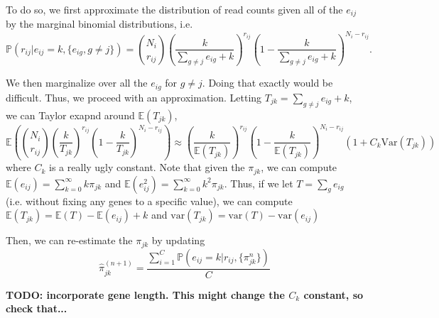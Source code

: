 \documentclass[11pt, oneside]{article}   	%
\begin{document}
To do so, we first approximate the distribution of read counts given all of the $e_{ij}$ by the marginal binomial distributions, i.e.
\[
\mathbb{P}(r_{ij} | e_{ij} = k, \{e_{ig}, g \neq j\}) = \binom{N_i}{r_{ij}} \left(\frac{k}{\sum_{g \neq j} e_{ig} + k}\right)^{r_{ij}}\left(1-\frac{k}{\sum_{g \neq j} e_{ig} + k}\right)^{N_i - r_{ij}}.
\]

We then marginalize over all the $e_{ig}$ for $g \neq j$. Doing that exactly would be difficult. Thus, we proceed with an approximation. Letting $T_{jk} = \sum_{g \neq j }e_{ig} + k$, we can Taylor exapnd around $\mathbb{E}(T_{jk})$, 
\[
\mathbb{E}\left(\binom{N_i}{r_{ij}} \left(\frac{k}{T_{jk}}\right)^{r_{ij}}\left(1-\frac{k}{T_{jk}}\right)^{N_i - r_{ij}}\right) \approx \left(\frac{k}{\mathbb{E}(T_{jk})} \right)^{r_{ij}}\left(1 - \frac{k}{\mathbb{E}(T_{jk})} \right)^{N_i - r_{ij}}\left(1 + C_k \text{Var}(T_{jk})\right)
\]
where $C_k$ is a really ugly constant. Note that given the $\pi_{jk}$, we can compute $\mathbb{E}(e_{ij}) = \sum_{k=0}^\infty k \pi_{jk}$ and $\mathbb{E}(e_{ij}^2) = \sum_{k=0}^\infty k^2 \pi_{jk}$. Thus, if we let $T = \sum_g e_{ig}$ (i.e. without fixing any genes to a specific value), we can compute $\mathbb{E}(T_{jk}) = \mathbb{E}(T) - \mathbb{E}(e_{ij})+k$ and $\text{var}(T_{jk}) = \text{var}(T) - \text{var}(e_{ij})$

Then, we can re-estimate the $\pi_{jk}$ by updating
\[
\hat{\pi}_{jk}^{(n+1)} = \frac{\sum_{i=1}^C \mathbb{P}(e_{ij} = k | r_{ij}, \{\pi_{jk}^{n}\})}{C}
\]

{\bf TODO: incorporate gene length. This might change the $C_k$ constant, so check that...}
\end{document}
